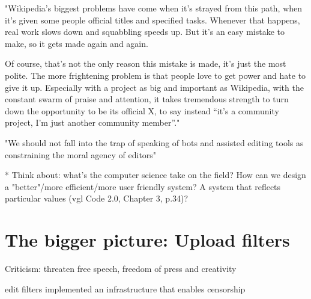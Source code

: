 "Wikipedia’s biggest problems have come when it’s strayed from this path, when it’s given some people official titles and specified tasks. Whenever that happens, real work slows down and squabbling speeds up. But it’s an easy mistake to make, so it gets made again and again.

Of course, that’s not the only reason this mistake is made, it’s just the most polite. The more frightening problem is that people love to get power and hate to give it up. Especially with a project as big and important as Wikipedia, with the constant swarm of praise and attention, it takes tremendous strength to turn down the opportunity to be its official X, to say instead “it’s a community project, I’m just another community member”."

\cite{GeiRib2010}
"We should not fall into the trap of speaking of bots and
assisted editing tools as constraining the moral agency of
editors"

* Think about: what's the computer science take on the field? How can we design a "better"/more efficient/more user friendly system? A system that reflects particular values (vgl Code 2.0, Chapter 3, p.34)?

\section{The bigger picture: Upload filters}

Criticism: threaten free speech, freedom of press and creativity

edit filters implemented an infrastructure that enables censorship

